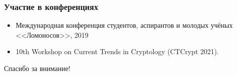 \begin{frame}
    \frametitle{Участие в конференциях}
    \begin{itemize}
	\item {} Международная конференция студентов, аспирантов и молодых учёных <<Ломоносов>>, 2019 
	\item 10th Workshop on Current Trends in Cryptology (CTCrypt 2021).
    \end{itemize}
\end{frame}

\begin{frame} %
    \begin{center}
        \Huge
        Спасибо за внимание!
    \end{center}
\end{frame}
